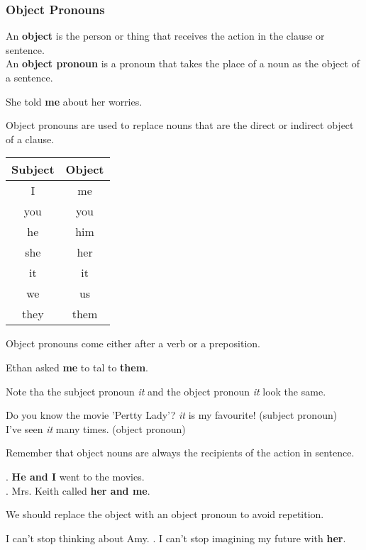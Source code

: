 \documentclass[10pt,a4paper]{article}
\begin{document}
\subsubsection{Object Pronouns}
An \textbf{object} is the person or thing that receives the action in the clause or sentence.\\
An \textbf{object pronoun} is a pronoun that takes the place of a noun as the object of a sentence.
\begin{center}
	She told \textbf{me} about her worries.
\end{center}

Object pronouns are used to replace nouns that are the direct or indirect object of a clause.
\begin{center}
\begin{tabular}{|c|c|}
	\hline
	\textbf{Subject} & \textbf{Object} \\
	\hline
	I & me \\
	you & you \\
	he & him \\
	she & her \\
	it & it \\
	we & us \\
	they & them \\
	\hline
\end{tabular}
\end{center}

Object pronouns come either after a verb or a preposition.
\begin{center}
		Ethan asked \textbf{me} to tal to \textbf{them}.
\end{center}

Note tha the subject pronoun \textit{it} and the object pronoun \textit{it} look the same.

\begin{center}
		Do you know the movie 'Pertty Lady'? \textit{it} is my favourite! (subject pronoun)\\
		I've seen \textit{it} many times. (object pronoun)
\end{center}
Remember that object nouns are always the recipients of the action in sentence.
\begin{center}
		. \textbf{He and I} went to the movies.\\
		. Mrs. Keith called \textbf{her and me}.
\end{center}

We should replace the object with an object pronoun to avoid repetition.
\begin{center}
		I can't stop thinking about Amy. . I can't stop imagining my future with \textbf{her}.
\end{center}
\end{document}
